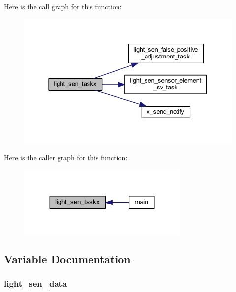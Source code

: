Here is the call graph for this function\+:\nopagebreak
\begin{figure}[H]
\begin{center}
\leavevmode
\includegraphics[width=331pt]{d6/d2d/a00047_ae9aa2f8b8e90a92755efbcd161c67bc0_cgraph}
\end{center}
\end{figure}




Here is the caller graph for this function\+:\nopagebreak
\begin{figure}[H]
\begin{center}
\leavevmode
\includegraphics[width=239pt]{d6/d2d/a00047_ae9aa2f8b8e90a92755efbcd161c67bc0_icgraph}
\end{center}
\end{figure}




\subsection{Variable Documentation}
\hypertarget{a00047_a53c98c9f84d5cecf0747bbe1f6b83696}{
\subsubsection[{light\+\_\+sen\+\_\+data}]{ light\+\_\+sen\+\_\+data}}\label{a00047_a53c98c9f84d5cecf0747bbe1f6b83696}


